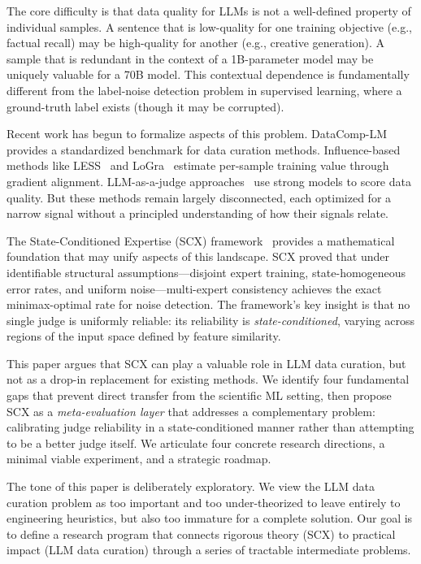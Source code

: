 \documentclass[11pt,twocolumn]{article}
\begin{document}
The core difficulty is that data quality for LLMs is not a well-defined property of individual samples. A sentence that is low-quality for one training objective (e.g., factual recall) may be high-quality for another (e.g., creative generation). A sample that is redundant in the context of a 1B-parameter model may be uniquely valuable for a 70B model. This contextual dependence is fundamentally different from the label-noise detection problem in supervised learning, where a ground-truth label exists (though it may be corrupted).

Recent work has begun to formalize aspects of this problem. DataComp-LM~\cite{li2024dclm} provides a standardized benchmark for data curation methods. Influence-based methods like LESS~\cite{xia2024less} and LoGra~\cite{choe2024loga} estimate per-sample training value through gradient alignment. LLM-as-a-judge approaches~\cite{zheng2024judging} use strong models to score data quality. But these methods remain largely disconnected, each optimized for a narrow signal without a principled understanding of how their signals relate.

The State-Conditioned Expertise (SCX) framework~\cite{scx2026} provides a mathematical foundation that may unify aspects of this landscape. SCX proved that under identifiable structural assumptions---disjoint expert training, state-homogeneous error rates, and uniform noise---multi-expert consistency achieves the exact minimax-optimal rate for noise detection. The framework's key insight is that no single judge is uniformly reliable: its reliability is \textit{state-conditioned}, varying across regions of the input space defined by feature similarity.

This paper argues that SCX can play a valuable role in LLM data curation, but not as a drop-in replacement for existing methods. We identify four fundamental gaps that prevent direct transfer from the scientific ML setting, then propose SCX as a \textit{meta-evaluation layer} that addresses a complementary problem: calibrating judge reliability in a state-conditioned manner rather than attempting to be a better judge itself. We articulate four concrete research directions, a minimal viable experiment, and a strategic roadmap.

The tone of this paper is deliberately exploratory. We view the LLM data curation problem as too important and too under-theorized to leave entirely to engineering heuristics, but also too immature for a complete solution. Our goal is to define a research program that connects rigorous theory (SCX) to practical impact (LLM data curation) through a series of tractable intermediate problems.
\end{document}
